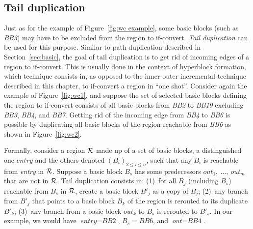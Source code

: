 \subsection{Tail duplication}

Just as for the example of Figure~\ref{fig:wc example}, some basic blocks (such as \textit{BB3}) may have to be excluded from the region to if-convert. 
\emph{Tail duplication}  can be used for this purpose. 
Similar to path duplication described in Section~\ref{sec:basic}, the goal of tail duplication is to get rid of incoming edges of a region to if-convert. 
This is usually done in the context of hyperblock formation, which technique consists in, as opposed to the inner-outer incremental technique described in this chapter, to if-convert a region in ``one shot''. 
Consider again the example of Figure~\ref{fig:wc1}, and suppose the set of selected basic blocks defining the region to if-convert consists of all basic blocks from \textit{BB2} to \textit{BB19} excluding \textit{BB3}, \textit{BB4}, and \textit{BB7}. 
Getting rid of the incoming edge from \textit{BB4} to \textit{BB6} is possible by duplicating all basic blocks of the region reachable from \textit{BB6} as shown in Figure~\ref{fig:wc2}.

Formally, consider a region $\cal R$ made up of a set of basic blocks, a distinguished one $\textit{entry}$ and the others denoted $\left(B_i\right)_{2\leq i\leq n}$, such that any $B_i$ is reachable from \textit{entry} in $\cal R$. 
Suppose a basic block $B_s$ has some predecessors $\textit{out}_1,\ \dots,\ \textit{out}_m$ that are not in $\cal R$. 
Tail duplication consists in: 
(1)~for all $B_j$ (including $B_s$) reachable from $B_s$ in $\cal R$, create a basic block $B'_j$ as a copy of $B_j$; 
(2)~any branch from $B'_j$ that points to a basic block $B_k$ of the region is rerouted to its duplicate $B'_k$; 
(3)~any branch from a basic block $\textit{out}_k$ to $B_s$ is rerouted to $B'_s$. 
In our example, we would have $\textit{entry}=\textit{BB2}$, $B_s=\textit{BB6}$, and $\textit{out}=\textit{BB4}$.

